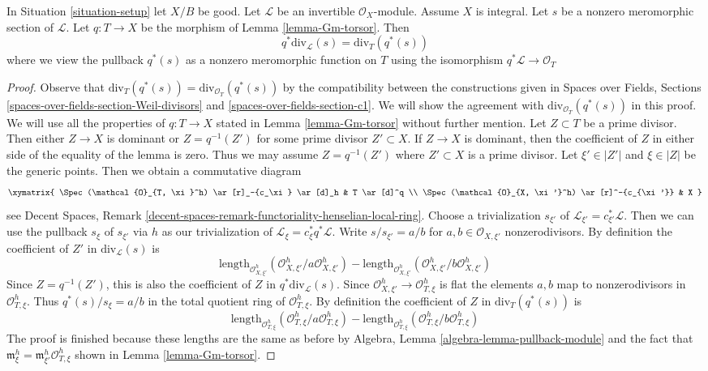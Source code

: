 \begin{lemma}
\label{lemma-Gm-torsor-divisor-meromorphic-section}
In Situation \ref{situation-setup} let $X/B$ be good.
Let $\mathcal{L}$ be an invertible $\mathcal{O}_X$-module.
Assume $X$ is integral. Let $s$ be a nonzero meromorphic
section of $\mathcal{L}$. Let $q : T \to X$ be the morphism
of Lemma \ref{lemma-Gm-torsor}. Then
$$
q^*\text{div}_\mathcal{L}(s) = \text{div}_T(q^*(s))
$$
where we view the pullback $q^*(s)$
as a nonzero meromorphic function on $T$
using the isomorphism $q^*\mathcal{L} \to \mathcal{O}_T$
\end{lemma}

\begin{proof}
Observe that $\text{div}_T(q^*(s)) = \text{div}_{\mathcal{O}_T}(q^*(s))$
by the compatibility between the constructions given in
Spaces over Fields, Sections
\ref{spaces-over-fields-section-Weil-divisors} and
\ref{spaces-over-fields-section-c1}.
We will show the agreement with $\text{div}_{\mathcal{O}_T}(q^*(s))$
in this proof.
We will use all the properties of $q : T \to X$ stated in
Lemma \ref{lemma-Gm-torsor} without further mention.
Let $Z \subset T$ be a prime divisor.
Then either $Z \to X$ is dominant or $Z = q^{-1}(Z')$ for some
prime divisor $Z' \subset X$.
If $Z \to X$ is dominant, then the coefficient of $Z$ in
either side of the equality of the lemma is zero.
Thus we may assume $Z = q^{-1}(Z')$ where $Z' \subset X$
is a prime divisor.
Let $\xi' \in |Z'|$ and $\xi \in |Z|$ be the generic points.
Then we obtain a commutative diagram
$$
\xymatrix{
\Spec(\mathcal{O}_{T, \xi}^h) \ar[r]_-{c_\xi} \ar[d]_h & T \ar[d]^q \\
\Spec(\mathcal{O}_{X, \xi'}^h) \ar[r]^-{c_{\xi'}} & X
}
$$
see Decent Spaces, Remark
\ref{decent-spaces-remark-functoriality-henselian-local-ring}.
Choose a trivialization $s_{\xi'}$ of
$\mathcal{L}_{\xi'} = c_{\xi'}^*\mathcal{L}$.
Then we can use the pullback $s_\xi$ of $s_{\xi'}$ via $h$
as our trivialization of $\mathcal{L}_\xi = c_\xi^* q^*\mathcal{L}$.
Write $s/s_{\xi'} = a/b$ for $a, b \in \mathcal{O}_{X, \xi'}$ nonzerodivisors.
By definition the coefficient of $Z'$ in
$\text{div}_\mathcal{L}(s)$ is
$$
\text{length}_{\mathcal{O}_{X, \xi'}^h}(
\mathcal{O}_{X, \xi'}^h/a \mathcal{O}_{X, \xi'}^h)
-
\text{length}_{\mathcal{O}_{X, \xi'}^h}(
\mathcal{O}_{X, \xi'}^h/b \mathcal{O}_{X, \xi'}^h)
$$
Since $Z = q^{-1}(Z')$, this is also the coefficient of $Z$ in
$q^*\text{div}_\mathcal{L}(s)$. Since
$\mathcal{O}_{X, \xi'}^h \to \mathcal{O}_{T, \xi}^h$
is flat the elements $a, b$ map to nonzerodivisors in
$\mathcal{O}_{T, \xi}^h$. Thus $q^*(s)/s_\xi = a/b$ in the total quotient
ring of $\mathcal{O}_{T, \xi}^h$. By definition the coefficient of
$Z$ in $\text{div}_T(q^*(s))$ is
$$
\text{length}_{\mathcal{O}_{T, \xi}^h}(
\mathcal{O}_{T, \xi}^h/a \mathcal{O}_{T, \xi}^h)
-
\text{length}_{\mathcal{O}_{T, \xi}^h}(
\mathcal{O}_{T, \xi}^h/b \mathcal{O}_{T, \xi}^h)
$$
The proof is finished because these lengths are the same as before
by Algebra, Lemma \ref{algebra-lemma-pullback-module} and the
fact that $\mathfrak m_\xi^h = \mathfrak m_{\xi'}^h\mathcal{O}_{T, \xi}^h$
shown in Lemma \ref{lemma-Gm-torsor}.
\end{proof}
